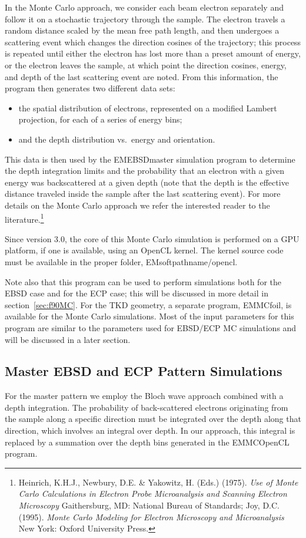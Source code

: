 \documentclass[DIV=calc, paper=letter, fontsize=11pt]{scrartcl}	 %
\begin{document}
In the Monte Carlo approach, we consider each beam electron separately and follow it on a stochastic trajectory 
through the sample.  The electron travels a random distance scaled by the mean free path length, and then undergoes a 
scattering event which changes the direction cosines of the trajectory; this process is repeated until either the electron has
lost more than a preset amount of energy, or the electron leaves the sample, at which point the direction cosines, energy,
and depth of the last scattering event are noted.  From this information, the program then generates two different data sets:
\begin{itemize}
	\item the spatial distribution of electrons, represented on a modified Lambert projection, for each of a series of 
	energy bins;
	\item and the depth distribution vs.\ energy and orientation.
\end{itemize}
This data is then used by the  EMEBSDmaster simulation program to determine the depth integration limits and the probability 
that an electron with a given energy was backscattered at a given depth (note that the depth is the effective distance traveled 
inside the sample after the last scattering event).  For more details on the Monte Carlo approach we refer the interested reader to
the literature.\footnote{Heinrich, K.H.J., Newbury, D.E. \& Yakowitz, H. (Eds.) (1975).
\textit{Use of Monte Carlo Calculations in Electron Probe Microanalysis and Scanning Electron Microscopy} Gaithersburg, MD: National Bureau of Standards;
Joy, D.C. (1995). \textit{Monte Carlo Modeling for Electron Microscopy and Microanalysis} New York: Oxford University Press.}

Since version 3.0, the core of this Monte Carlo simulation is performed on a GPU platform, if one is available, using an OpenCL kernel.  The kernel source code 
must be available in the proper folder, \textsf{EMsoftpathname/opencl}.

Note also that this program can be used to perform simulations both for the EBSD case and for the ECP case; this will be discussed in more 
detail in section~\ref{sec:f90MC}.  For the TKD geometry, a separate program, \textsf{EMMCfoil}, is available for the Monte Carlo simulations. 
Most of the input parameters for this program are similar to the parameters used for EBSD/ECP MC simulations and will be discussed in a later section.

\subsection{Master EBSD and ECP Pattern Simulations \label{sec:Master}}
For the master pattern we employ the Bloch wave approach combined with a depth integration.  The probability 
of back-scattered electrons originating from the sample along a specific direction must be integrated over the depth
along that direction, which involves an integral over depth.  In our approach, this integral is replaced by a summation
over the depth bins generated in the \textsf{EMMCOpenCL} program.  
\end{document}
